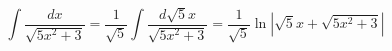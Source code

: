 \documentclass[../rgr1.tex]{subfiles}
\begin{document}
\Solution

\begin{equation}
	\int \frac{dx}{ \sqrt{5x^2+3} } =
	\frac{1}{\sqrt{5}}\int \frac{d\sqrt5 x}{ \sqrt{5x^2+3} } =
	\frac{1}{\sqrt{5}}\ln\left|\sqrt5 x + \sqrt{5x^2+3}\right|
\end{equation}

\end{document}
